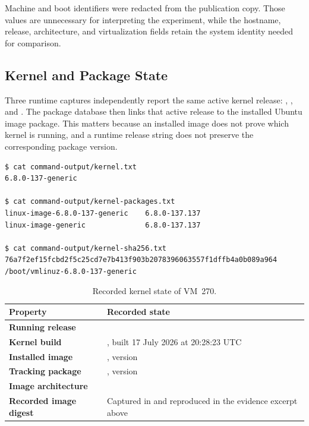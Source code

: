 Machine and boot identifiers were redacted from the publication copy. Those
values are unnecessary for interpreting the experiment, while the hostname,
release, architecture, and virtualization fields retain the system identity
needed for comparison.

\subsection{Kernel and Package State}

Three runtime captures independently report the same active kernel release:
, , and . The package
database then links that active release to the installed Ubuntu image package.
This matters because an installed image does not prove which kernel is running,
and a runtime release string does not preserve the corresponding package
version.

\begin{lstlisting}
$ cat command-output/kernel.txt
6.8.0-137-generic

$ cat command-output/kernel-packages.txt
linux-image-6.8.0-137-generic    6.8.0-137.137
linux-image-generic              6.8.0-137.137

$ cat command-output/kernel-sha256.txt
76a7f2ef15fcbd2f5c25cd7e7b413f903b2078396063557f1dffb4a0b089a964  /boot/vmlinuz-6.8.0-137-generic
\end{lstlisting}

\begin{table}[H]
    \centering
    \caption{Recorded kernel state of VM~270.}
    \label{tab:baseline-kernel-state}
    \small
    \begin{tabularx}{\textwidth}{@{}>{\bfseries}p{}Y@{}}
        \toprule
        Property & Recorded state \\
        \midrule
        Running release &
         \\

        Kernel build &
        , built 17 July 2026 at
        20:28:23 UTC \\

        Installed image &
        , version
         \\

        Tracking package &
        , version  \\

        Image architecture &
         \\

        Recorded image digest &
        Captured in  and reproduced
        in the evidence excerpt above \\
        \bottomrule
    \end{tabularx}
\end{table}

